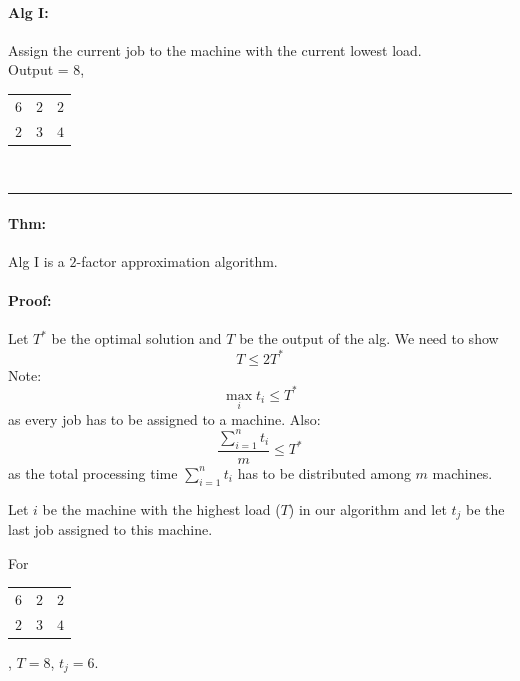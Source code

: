 \documentclass[12 pt]{article}
\begin{document}
          \paragraph{Alg I:} Assign the current job to the machine
          with the current lowest load.
          \\ Output = $8$,
          \begin{tabular}{|l|l|l|}
            \hline $6$&$2$&$2$
            \\ $2$ & $3$ & $4$
            \\ \hline
          \end{tabular}
          \\ \noindent \rule{\textwidth}{0.5pt}
          \paragraph{Thm:} Alg I is a $2$-factor approximation
          algorithm.
          \paragraph{Proof:} Let $T^*$ be the optimal solution and $T$
          be the output of the alg. We need to show
          $$T \leq 2 T^*$$
          Note:
          \begin{equation}
            \label{eq:lbt}
          \max_i t_i \leq T^*
          \end{equation}
          as every job has to be assigned
          to a machine. Also:
          \begin{equation}
            \label{eq:lb2t}
          \frac{\sum_{i=1}^n t_i}{m} \leq T^*
          \end{equation} as the total processing time $\sum_{i=1}^n
          t_i$ has to be distributed among $m$ machines.

          Let $i$ be the machine with the highest load ($T$) in our
          algorithm and let $t_j$ be the last job assigned to this
          machine.

          For
          \begin{tabular}{|l|l|l|}
            \hline $6$&$2$&$2$
            \\ $2$ & $3$ & $4$
            \\ \hline
          \end{tabular}
          , $T=8$, $t_j = 6$.
\end{document}
